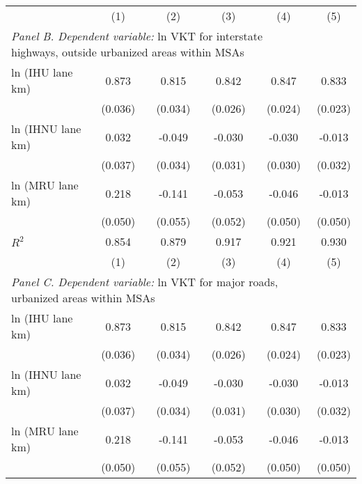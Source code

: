 \begin{table}[htbp]
\begin{tabular}{l*{5}{c}}
          \hline                 
                    &\multicolumn{1}{c}{(1)}         &\multicolumn{1}{c}{(2)}         &\multicolumn{1}{c}{(3)}         &\multicolumn{1}{c}{(4)}         &\multicolumn{1}{c}{(5)}         \\
  \multicolumn{5}{l}{ \emph{Panel B. Dependent variable:} ln VKT for interstate highways, outside urbanized areas within MSAs} \\ 
ln (IHU lane km)    &       0.873\sym{***}&       0.815\sym{***}&       0.842\sym{***}&       0.847\sym{***}&       0.833\sym{***}\\
                    &     (0.036)         &     (0.034)         &     (0.026)         &     (0.024)         &     (0.023)         \\
[1em]
ln (IHNU lane km)   &       0.032         &      -0.049         &      -0.030         &      -0.030         &      -0.013         \\
                    &     (0.037)         &     (0.034)         &     (0.031)         &     (0.030)         &     (0.032)         \\
[1em]
ln (MRU lane km)    &       0.218\sym{***}&      -0.141\sym{*}  &      -0.053         &      -0.046         &      -0.013         \\
                    &     (0.050)         &     (0.055)         &     (0.052)         &     (0.050)         &     (0.050)         \\
 
\(R^{2}\)           &       0.854         &       0.879         &       0.917         &       0.921         &       0.930         \\
 
          \hline                 
                    &\multicolumn{1}{c}{(1)}         &\multicolumn{1}{c}{(2)}         &\multicolumn{1}{c}{(3)}         &\multicolumn{1}{c}{(4)}         &\multicolumn{1}{c}{(5)}         \\
 \multicolumn{5}{l}{ \emph{Panel C. Dependent variable:} ln VKT for major roads, urbanized areas within MSAs} \\ 
ln (IHU lane km)    &       0.873\sym{***}&       0.815\sym{***}&       0.842\sym{***}&       0.847\sym{***}&       0.833\sym{***}\\
                    &     (0.036)         &     (0.034)         &     (0.026)         &     (0.024)         &     (0.023)         \\
[1em]
ln (IHNU lane km)   &       0.032         &      -0.049         &      -0.030         &      -0.030         &      -0.013         \\
                    &     (0.037)         &     (0.034)         &     (0.031)         &     (0.030)         &     (0.032)         \\
[1em]
ln (MRU lane km)    &       0.218\sym{***}&      -0.141\sym{*}  &      -0.053         &      -0.046         &      -0.013         \\
                    &     (0.050)         &     (0.055)         &     (0.052)         &     (0.050)         &     (0.050)         \\
 

\end{tabular}
\end{table}
